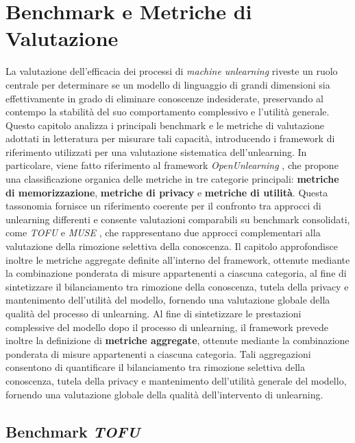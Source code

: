 \def\baselinestretch{1}
\chapter{Benchmark e Metriche di Valutazione}\label{cap:metriche}
\def\baselinestretch{1.66}

La valutazione dell’efficacia dei processi di \emph{machine unlearning} riveste un ruolo centrale per determinare se un modello di linguaggio di grandi dimensioni sia effettivamente in grado di eliminare conoscenze indesiderate, preservando al contempo la stabilità del suo comportamento complessivo e l’utilità generale. 
Questo capitolo analizza i principali benchmark e le metriche di valutazione adottati in letteratura per misurare tali capacità, introducendo i framework di riferimento utilizzati per una valutazione sistematica dell’unlearning. 
In particolare, viene fatto riferimento al framework \textit{OpenUnlearning} \cite{openunlearning2025}, che propone una classificazione organica delle metriche in tre categorie principali: \textbf{metriche di memorizzazione}, \textbf{metriche di privacy} e \textbf{metriche di utilità}. 
Questa tassonomia fornisce un riferimento coerente per il confronto tra approcci di unlearning differenti e consente valutazioni comparabili su benchmark consolidati, come \textit{TOFU} \cite{maini2024tofu} e \textit{MUSE} \cite{shi2025muse}, che rappresentano due approcci complementari alla valutazione della rimozione selettiva della conoscenza. 
Il capitolo approfondisce inoltre le metriche aggregate definite all’interno del framework, ottenute mediante la combinazione ponderata di misure appartenenti a ciascuna categoria, al fine di sintetizzare il bilanciamento tra rimozione della conoscenza, tutela della privacy e mantenimento dell’utilità del modello, fornendo una valutazione globale della qualità del processo di unlearning.
Al fine di sintetizzare le prestazioni complessive del modello dopo il processo di unlearning, il framework prevede inoltre la definizione di \textbf{metriche aggregate}, ottenute mediante la combinazione ponderata di misure appartenenti a ciascuna categoria.  
Tali aggregazioni consentono di quantificare il bilanciamento tra rimozione selettiva della conoscenza, tutela della privacy e mantenimento dell'utilità generale del modello, fornendo una valutazione globale della qualità dell'intervento di unlearning.

\medskip

\section{Benchmark \emph{TOFU}}

